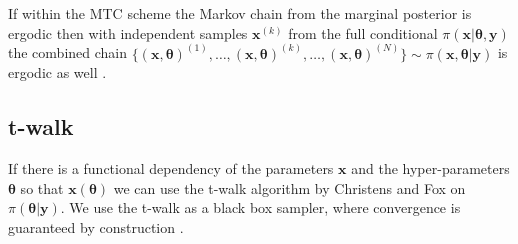 If within the MTC scheme the Markov chain from the marginal posterior is ergodic then with independent samples $\bm{x}^{(k)}$ from the full conditional $\pi(\bm{x}|\bm{\theta}, \bm{y})$ the combined chain $\{  (\bm{x}, \bm{\theta} )^{(1)}, \dots, (\bm{x}, \bm{\theta} )^{(k)} , \dots,  (\bm{x}, \bm{\theta})^{(N)}  \} \sim \pi(\bm{x},\bm{\theta}| \bm{y})$ is ergodic as well \cite{acosta2014markov}.

\subsection{t-walk}
If there is a functional dependency of the parameters $\bm{x}$ and the hyper-parameters $\bm{\theta}$ so that $\bm{x}(\bm{\theta})$ we can use the t-walk algorithm by Christens and Fox on $\pi(\bm{\theta}|\bm{y} )$.
We use the t-walk as a black box sampler, where convergence is guaranteed by construction \cite{christen2010general}.



